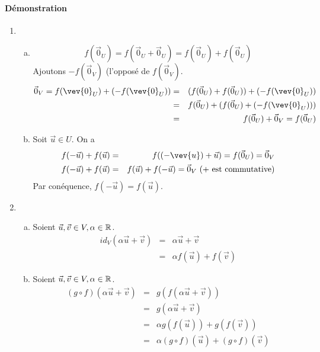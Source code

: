 \paragraph{Démonstration}
\begin{enumerate}
  \item
    \begin{enumerate}[a)]
      \item $$f(\vec{0}_U) = f(\vec{0}_U + \vec{0}_U) = f(\vec{0}_U) + f(\vec{0}_U)$$
        Ajoutons $-f(\vec{0}_V)$ (l'opposé de $f(\vec{0}_V)$.
        \begin{eqnarray*}
          \vec{0}_V = f(\vev{0}_U) + (-f(\vev{0}_U)) &=& (f(\vec{0}_U) + f(\vec{0}_U)) + (-f(\vev{0}_U)) \\
            &=& f(\vec{0}_U) + (f(\vec{0}_U) + (-f(\vev{0}_U))) \\
            &=& f(\vec{0}_U) + \vec{0}_V = f(\vec{0}_U)
        \end{eqnarray*}
      \item Soit $\vec{u} \in U$. On a
        \begin{eqnarray*}
          f(-\vec{u}) + f(\vec{u}) &=& f((-\vev{u}) + \vec{u}) = f(\vec{0}_U) = \vec{0}_V \\
          f(-\vec{u}) + f(\vec{u}) &=& f(\vec{u}) + f(-\vec{u}) = \vec{0}_V ~ \text{(+ est commutative)}
        \end{eqnarray*}
        Par conéquence, $f(-\vec{u}) = f(\vec{u})$.
    \end{enumerate}
  \item
    \begin{enumerate}[a)]
      \item Soient $\vec{u}, \vec{v} \in V, \alpha \in \mathbb{R}$.
        \begin{eqnarray*}
          id_V(\alpha \vec{u} + \vec{v}) &=& \alpha \vec{u} + \vec{v} \\
            &=& \alpha f(\vec{u}) + f(\vec{v})
        \end{eqnarray*}
      \item Soient $\vec{u}, \vec{v} \in V, \alpha \in \mathbb{R}$.
        \begin{eqnarray*}
          (g \circ f)(\alpha \vec{u} +\vec{v}) &=& g(f(\alpha \vec{u} +\vec{v})) \\
            &=& g(\alpha \vec{u} + \vec{v}) \\
            &=& \alpha g(f(\vec{u})) + g(f(\vec{v})) \\
            &=& \alpha (g \circ f)(\vec{u}) + (g \circ f)(\vec{v})
        \end{eqnarray*}
    \end{enumerate}
\end{enumerate}

